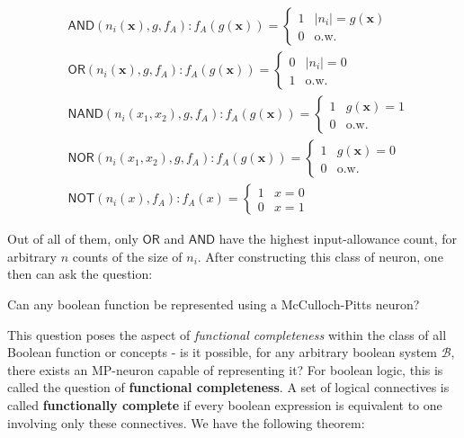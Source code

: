 \begin{align*}
    & \mathsf{AND} (n_{i}(\mathbf{x}),g,f_{A}): f_{A}(g(\mathbf{x})) = \begin{cases}
        1 & \lvert n_{i} \rvert = g(\mathbf{x})\\
        0 & \text{o.w.}
    \end{cases}\\
    & \mathsf{OR} (n_{i}(\mathbf{x}),g,f_{A}): f_{A}(g(\mathbf{x})) = \begin{cases}
        0 & \lvert n_{i} \rvert = 0\\
        1 & \text{o.w.}
    \end{cases}\\
    & \mathsf{NAND}(n_{i}(x_1, x_2), g,f_{A}) : f_{A}(g(\mathbf{x})) = \begin{cases}
        1 & g(\mathbf{x}) = 1\\
        0 & \text{o.w.}
    \end{cases}\\
    & \mathsf{NOR}(n_{i}(x_1, x_2),g,f_{A}): f_{A}(g(\mathbf{x})) = \begin{cases}
        1 & g(\mathbf{x}) = 0\\
        0 & \text{o.w.}
    \end{cases}\\
    & \mathsf{NOT}(n_{i}(x),f_A) : f_{A}(x) = \begin{cases}
        1 & x = 0\\
        0 & x = 1
    \end{cases}
\end{align*}

Out of all of them, only $\mathsf{OR}$ and $\mathsf{AND}$ have the highest input-allowance count, for arbitrary $n$ counts of the size of $n_{i}$. After constructing this class of neuron, one then can ask the question: 
\begin{question}
Can any boolean function be represented using a McCulloch-Pitts neuron?
\end{question}
This question poses the aspect of \textit{functional completeness} within the class of all Boolean function or concepts - is it possible, for any arbitrary boolean system $\mathcal{B}$, there exists an MP-neuron capable of representing it? For boolean logic, this is called the question of \textbf{functional completeness}. A set of logical connectives is called \textbf{functionally complete} if every boolean expression is equivalent to one involving only these connectives. We have the following theorem: 

